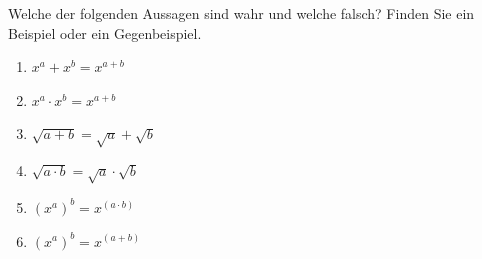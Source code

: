 \begin{ExerciseBlock}
Welche der folgenden Aussagen sind wahr und welche falsch? Finden Sie ein Beispiel oder ein Gegenbeispiel.
\begin{enumerate}[label=\alph*)]
	\item $\displaystyle x^a + x^b = x^{a+b}$
	\item $\displaystyle x^a \cdot x^b = x^{a+b}$
	\item $\displaystyle \sqrt{a + b} = \sqrt{a} + \sqrt{b}$
	\item $\displaystyle \sqrt{a \cdot b} = \sqrt{a} \cdot \sqrt{b}$
	\item $\displaystyle \left( x^a \right)^b = x^{\left(a \cdot b \right)}$
	\item $\displaystyle \left( x^a \right)^b = x^{\left(a + b \right)}$
\end{enumerate}

\end{ExerciseBlock}
